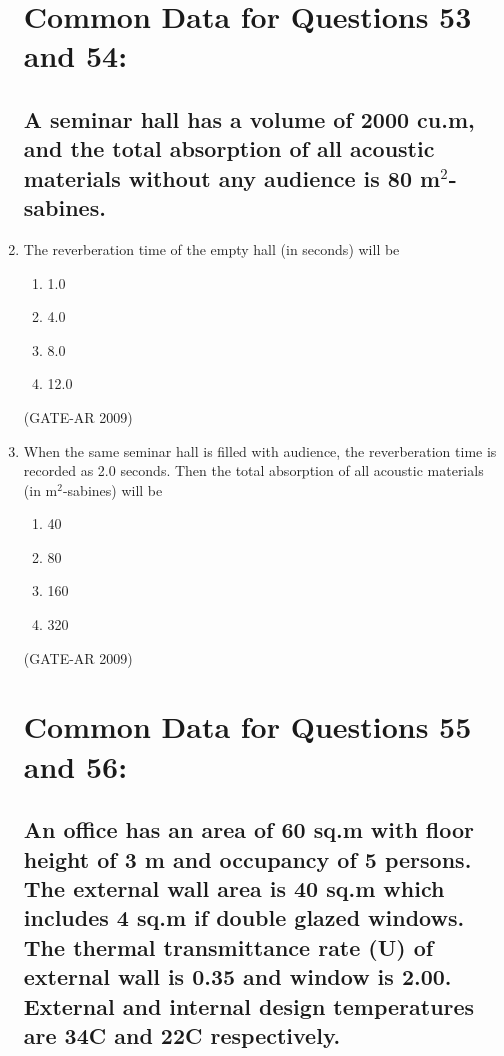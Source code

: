 \documentclass[a4paper,10pt]{article}
\begin{document}
\begin{enumerate}
\section*{Common Data for Questions 53 and 54:}
\subsection*{A seminar hall has a volume of 2000 cu.m, and the total absorption of all acoustic materials without any audience is 80 m\(^2\)-sabines.}

    \item The reverberation time of the empty hall (in seconds) will be 
    \begin{multicols}{4}
	\begin{enumerate}
        \item 1.0
        \item 4.0
        \item 8.0
        \item 12.0
    \end{enumerate}
	\end{multicols}
    \hfill (GATE-AR 2009)

    \item When the same seminar hall is filled with audience, the reverberation time is recorded as 2.0 seconds. Then the total absorption of all acoustic materials (in m\(^2\)-sabines) will be 
    \begin{multicols}{4}
	\begin{enumerate}
        \item 40
        \item 80
        \item 160
        \item 320
    \end{enumerate}
	\end{multicols}
    \hfill (GATE-AR 2009)
	
\section*{Common Data for Questions 55 and 56:}
\subsection*{An office has an area of 60 sq.m with floor height of 3 m and occupancy of 5 persons. The external wall area is 40 sq.m which includes 4 sq.m if double glazed windows. The thermal transmittance rate (U) of external wall is 0.35 and window is 2.00. External and internal design temperatures are 34\textdegree C and 22\textdegree C respectively.}


\end{enumerate}
\end{document}
